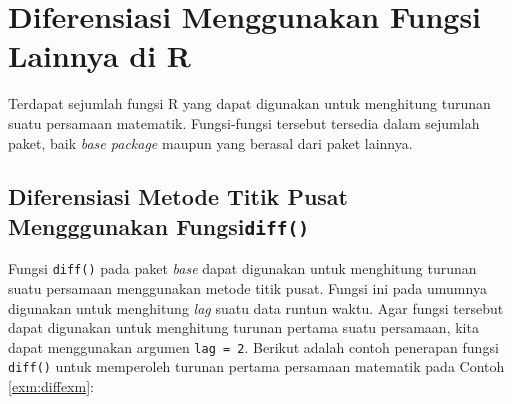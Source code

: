 \documentclass[]{book}
\newenvironment{Shaded}{\begin{snugshade}}{\end{snugshade}}
\newcommand{\CommentTok}[1]{\textcolor[rgb]{0.56,0.35,0.01}{\textit{#1}}}
\newcommand{\ControlFlowTok}[1]{\textcolor[rgb]{0.13,0.29,0.53}{\textbf{#1}}}
\newcommand{\DataTypeTok}[1]{\textcolor[rgb]{0.13,0.29,0.53}{#1}}
\newcommand{\DecValTok}[1]{\textcolor[rgb]{0.00,0.00,0.81}{#1}}
\newcommand{\KeywordTok}[1]{\textcolor[rgb]{0.13,0.29,0.53}{\textbf{#1}}}
\newcommand{\NormalTok}[1]{#1}
\newcommand{\OperatorTok}[1]{\textcolor[rgb]{0.81,0.36,0.00}{\textbf{#1}}}
\newcommand{\StringTok}[1]{\textcolor[rgb]{0.31,0.60,0.02}{#1}}
\theoremstyle{definition}
\theoremstyle{definition}
\theoremstyle{definition}
\theoremstyle{remark}
\begin{document}
\hypertarget{diffother}{%
\section{Diferensiasi Menggunakan Fungsi Lainnya di R}\label{diffother}}

Terdapat sejumlah fungsi R yang dapat digunakan untuk menghitung turunan suatu persamaan matematik. Fungsi-fungsi tersebut tersedia dalam sejumlah paket, baik \emph{base package} maupun yang berasal dari paket lainnya.

\hypertarget{diferensiasi-metode-titik-pusat-mengggunakan-fungsidiff}{%
\subsection{\texorpdfstring{Diferensiasi Metode Titik Pusat Mengggunakan Fungsi\texttt{diff()}}{Diferensiasi Metode Titik Pusat Mengggunakan Fungsidiff()}}\label{diferensiasi-metode-titik-pusat-mengggunakan-fungsidiff}}

Fungsi \texttt{diff()} pada paket \emph{base} dapat digunakan untuk menghitung turunan suatu persamaan menggunakan metode titik pusat. Fungsi ini pada umumnya digunakan untuk menghitung \emph{lag} suatu data runtun waktu. Agar fungsi tersebut dapat digunakan untuk menghitung turunan pertama suatu persamaan, kita dapat menggunakan argumen \texttt{lag\ =\ 2}. Berikut adalah contoh penerapan fungsi \texttt{diff()} untuk memperoleh turunan pertama persamaan matematik pada Contoh \ref{exm:diffexm}:

\begin{Shaded}
\end{Shaded}
\end{document}
